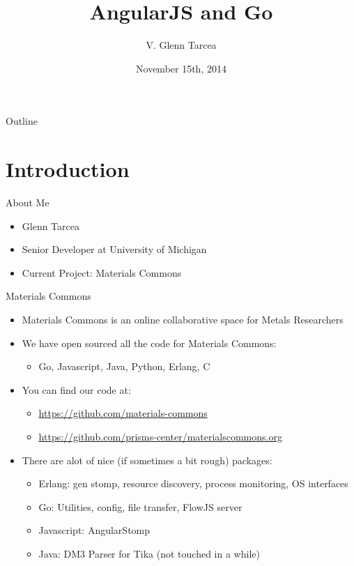 \documentclass[presentation]{beamer}
\author{V. Glenn Tarcea}
\date{November 15th, 2014}
\title{AngularJS and Go}
\begin{document}
\maketitle
\begin{frame}{Outline}
\tableofcontents
\end{frame}


\section{Introduction}
\label{sec-1}

\begin{frame}[label=sec-1-1]{About Me}
\begin{itemize}
\item Glenn Tarcea
\item Senior Developer at University of Michigan
\item Current Project: Materials Commons
\end{itemize}
\end{frame}

\begin{frame}[label=sec-1-2]{Materials Commons}
\begin{itemize}
\item Materials Commons is an online collaborative space for Metals Researchers
\item We have open sourced all the code for Materials Commons:
\begin{itemize}
\item Go, Javascript, Java, Python, Erlang, C
\end{itemize}
\item You can find our code at:
\begin{itemize}
\item \url{https://github.com/materials-commons}
\item \url{https://github.com/prisms-center/materialscommons.org}
\end{itemize}
\item There are alot of nice (if sometimes a bit rough) packages:
\begin{itemize}
\item Erlang: gen stomp, resource discovery, process monitoring, OS interfaces
\item Go: Utilities, config, file transfer, FlowJS server
\item Javascript: AngularStomp
\item Java: DM3 Parser for Tika (not touched in a while)
\end{itemize}
\end{itemize}
\end{frame}
\end{document}
